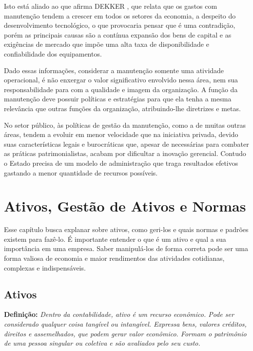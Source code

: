 Isto está aliado ao que afirma DEKKER \cite{dekker1998}, que relata que os gastos com manutenção tendem a crescer em todos os setores da economia, a despeito do desenvolvimento tecnológico, o que provocaria pensar que é uma contradição, porém as principais causas são a contínua expansão dos bens de capital e as exigências de mercado que impõe uma alta taxa de disponibilidade e confiabilidade dos equipamentos.

Dado essas informações, considerar a manutenção somente uma atividade operacional, é não enxergar o valor significativo envolvido nessa área, nem sua responsabilidade para com a qualidade e imagem da organização. A função da manutenção deve possuir políticas e estratégias para que ela tenha a mesma relevância que outras funções da organização, atribuindo-lhe diretrizes e metas.	

No setor público, às políticas de gestão da manutenção, como a de muitas outras áreas, tendem a evoluir em menor velocidade que na iniciativa privada, devido suas características legais e burocráticas que, apesar de necessárias para combater as práticas patrimonialistas, acabam por dificultar a inovação gerencial. Contudo o Estado precisa de um modelo de administração que traga resultados efetivos gastando a menor quantidade de recursos possíveis.


\chapter{Ativos, Gestão de Ativos e Normas}
\label{cap-ativos}

Esse capítulo busca explanar sobre ativos, como geri-los e quais normas e padrões existem para fazê-lo. É importante entender o que é um ativo e qual a sua importância em uma empresa. Saber manipulá-los de forma correta pode ser uma forma valiosa de economia e maior rendimentos das atividades cotidianas, complexas e indispensáveis.

\section{Ativos}

\textbf{Definição:} \emph{Dentro da contabilidade, ativo é um recurso econômico. Pode ser considerado qualquer coisa tangível ou intangível. Expressa bens, valores créditos, direitos e assemelhados, que podem gerar valor econômico. Formam o patrimônio de uma pessoa singular ou coletiva e são avaliados pelo seu custo.} \cite{sullivan2003}\cite{fulgencio2007} 

